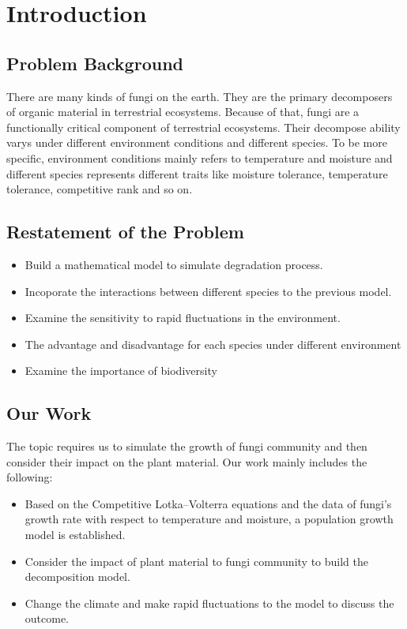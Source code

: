 \section{Introduction}
	\subsection{Problem Background}
	There are many kinds of fungi on the earth. They are the primary decomposers of organic material in terrestrial ecosystems. Because of that, fungi are a functionally critical component of terrestrial ecosystems. Their decompose ability varys under different environment conditions and different species. To be more specific, environment conditions mainly refers to temperature and moisture and different species represents different traits like moisture tolerance, temperature tolerance, competitive rank and so on.
	\subsection{Restatement of the Problem}
	\begin{itemize}
		\item Build a mathematical model to simulate degradation process.
		\item Incoporate the interactions between different species to the previous model.
		\item Examine the sensitivity to rapid fluctuations in the environment.
		\item The advantage and disadvantage for each species under different environment
		\item Examine the importance of biodiversity
	\end{itemize}
	
	\subsection{Our Work}
	The topic requires us to simulate the growth of fungi community and then consider their impact on the plant material. Our work mainly includes the following:
	\begin{itemize}
		\item Based on the Competitive Lotka–Volterra equations and the data of fungi’s growth rate with respect to temperature and moisture, a population growth model is established.
		\item Consider the impact of plant material to fungi community to build the decomposition model.
		\item Change the climate and make rapid fluctuations to the model to discuss the outcome.
	\end{itemize}	